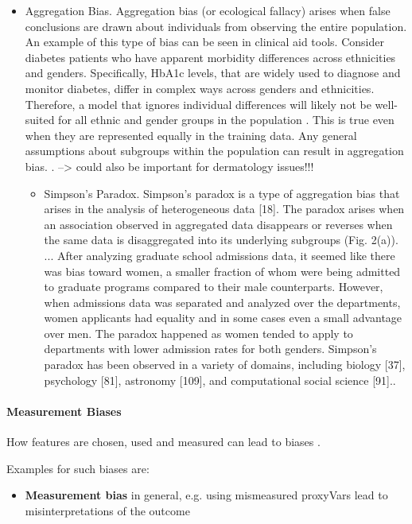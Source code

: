 \begin{refsection}
\begin{itemize}
			\item Aggregation Bias. Aggregation bias (or ecological fallacy) arises when false conclusions are drawn about individuals from observing the entire population. An example of this type of bias can be seen in clinical aid tools. Consider diabetes patients who have apparent morbidity differences across ethnicities and genders. Specifically, HbA1c levels, that are widely used to diagnose and monitor diabetes, differ in complex ways across genders and ethnicities. Therefore, a model that ignores individual differences will likely not be well-suited for all ethnic and gender groups in the population \autocite{M144_Suresh_2021}. This is true even when they are represented equally in the training data. Any general assumptions about subgroups within the population can result in aggregation bias. \autocite{Mehrabi_2021}. --> could also be important for dermatology issues!!!
			\begin{itemize}
				\item Simpson’s Paradox. Simpson’s paradox is a type of aggregation bias that arises in the analysis of heterogeneous data [18]. The paradox arises when an association observed in aggregated data disappears or reverses when the same data is disaggregated into its underlying subgroups (Fig. 2(a)). ... After analyzing graduate school admissions data, it seemed like there was bias toward women, a smaller fraction of whom were being admitted to graduate programs compared to their male counterparts. However, when admissions data was separated and analyzed over the departments, women applicants had equality and in some cases even a small advantage over men. The paradox happened as women tended to apply to departments with lower admission rates for both genders. Simpson’s paradox has been observed in a variety of domains, including biology [37], psychology [81], astronomy [109], and computational social science [91].\autocite{Mehrabi_2021}.
			\end{itemize}
		\end{itemize}
		\rawcitationusedend
		\rawcitationend
		
		\paragraph{Measurement Biases}
		How features are chosen, used and measured can lead to biases \autocites{Mehrabi_2021}{M144_Suresh_2021}.
		
		Examples for such biases are:
		\begin{itemize}
			\item \textbf{Measurement bias} in general, e.g. using mismeasured \glspl{proxyVar} lead to misinterpretations of the outcome \autocite{Mehrabi_2021}
			

\end{itemize}
\end{refsection}

